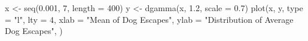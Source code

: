 \begin{Schunk}
\begin{Sinput}
 x <- seq(0.001, 7, length = 400)
 y <- dgamma(x, 1.2, scale = 0.7)
 plot(x, y, type = "l", lty = 4, xlab = "Mean of Dog Escapes", ylab = "Distribution of Average Dog Escapes", 
      )
\end{Sinput}
\end{Schunk}

